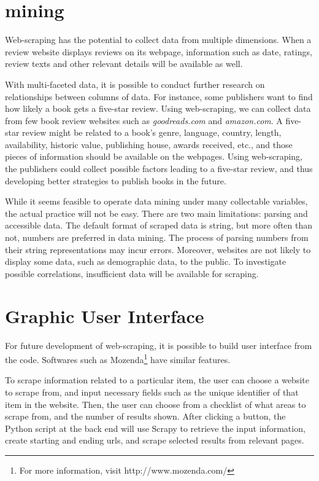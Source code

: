 \documentclass[12pt]{report}
\begin{document}
\section{\gls{mining}}

Web-scraping has the potential to collect data from multiple dimensions. When a review website displays reviews on its webpage, information such as date, ratings, review texts and other relevant details will be available as well. 

With multi-faceted data, it is possible to conduct further research on relationships between columns of data. For instance, some publishers want to find how likely a book gets a five-star review. Using web-scraping, we can collect data from few book review websites such as \textit{goodreads.com} and \textit{amazon.com}. A five-star review might be related to a book's genre, language, country, length, availability, historic value, publishing house, awards received, etc., and those pieces of information should be available on the webpages. Using web-scraping, the publishers could collect possible factors leading to a five-star review, and thus developing better strategies to publish books in the future.

While it seems feasible to operate data mining under many collectable variables, the actual practice will not be easy. There are two main limitations: parsing and accessible data. The default format of scraped data is string, but more often than not, numbers are preferred in data mining. The process of parsing numbers from their string representations may incur errors. Moreover, websites are not likely to display some data, such as demographic data, to the public. To investigate possible correlations, insufficient data will be available for scraping.


\section{Graphic User Interface}

For future development of web-scraping, it is possible to build user interface from the code. Softwares such as Mozenda\footnote{For more information, visit http://www.mozenda.com/} have similar features.

To scrape information related to a particular item, the user can choose a website to scrape from, and input necessary fields such as the unique identifier of that item in the website. Then, the user can choose from a checklist of what areas to scrape from, and the number of results shown. After clicking a button, the Python script at the back end will use Scrapy to retrieve the input information, create starting and ending urls, and scrape selected results from relevant pages.
\end{document}
